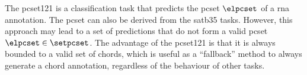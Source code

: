 
The \gls{pcset121} is a classification task that predicts
the \gls{pcset} $\elpcset$ of a \gls{rna} annotation. The
\gls{pcset} can also be derived from the \gls{satb35} tasks.
However, this approach may lead to a set of predictions that
do not form a valid \gls{pcset} $\elpcset \in \setpcset$.
The advantage of the \gls{pcset121} is that it is always
bounded to a valid set of chords, which is useful as a
``fallback'' method to always generate a chord annotation,
regardless of the behaviour of other tasks.




